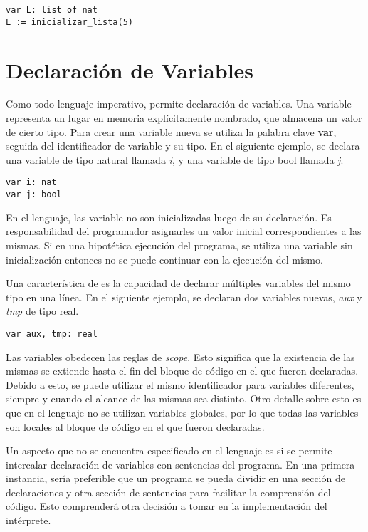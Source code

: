 \documentclass{article}
\begin{document}
\begin{lstlisting}
var L: list of nat
L := inicializar_lista(5)
\end{lstlisting}

\section{Declaración de Variables}

Como todo lenguaje imperativo, \Lang\space permite declaración de variables.
Una variable representa un lugar en memoria explícitamente nombrado, que almacena un valor de cierto tipo.
Para crear una variable nueva se utiliza la palabra clave \textbf{var}, seguida del identificador de variable y su tipo.
En el siguiente ejemplo, se declara una variable de tipo natural llamada \textit{i}, y una variable de tipo bool llamada \textit{j}.

\begin{lstlisting}
var i: nat
var j: bool
\end{lstlisting}

En el lenguaje, las variable no son inicializadas luego de su declaración.
Es responsabilidad del programador asignarles un valor inicial correspondientes a las mismas.
Si en una hipotética ejecución del programa, se utiliza una variable sin inicialización entonces no se puede continuar con la ejecución del mismo.

Una característica de \Lang\space es la capacidad de declarar múltiples variables del mismo tipo en una línea.
En el siguiente ejemplo, se declaran dos variables nuevas, \textit{aux} y \textit{tmp} de tipo real.

\begin{lstlisting}
var aux, tmp: real
\end{lstlisting}

Las variables obedecen las reglas de \textit{scope}.
Esto significa que la existencia de las mismas se extiende hasta el fin del bloque de código en el que fueron declaradas.
Debido a esto, se puede utilizar el mismo identificador para variables diferentes, siempre y cuando el alcance de las mismas sea distinto.
Otro detalle sobre esto es que en el lenguaje no se utilizan variables globales, por lo que todas las variables son locales al bloque de código en el que fueron declaradas.

Un aspecto que no se encuentra especificado en el lenguaje es si se permite intercalar declaración de variables con sentencias del programa.
En una primera instancia, sería preferible que un programa se pueda dividir en una sección de declaraciones y otra sección de sentencias para facilitar la comprensión del código.
Esto comprenderá otra decisión a tomar en la implementación del intérprete.
\end{document}
